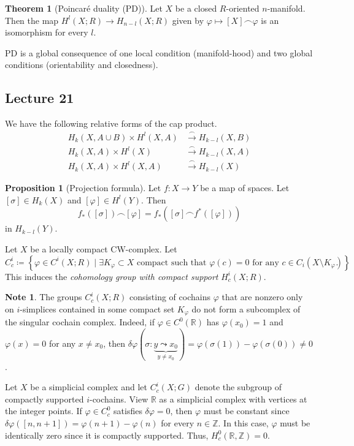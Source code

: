 \documentclass[10pt,letterpaper,cm]{nupset}
\theoremstyle{definition}
\newtheorem{note}[definition]{Note}
\theoremstyle{theorem}
\newtheorem{theorem}[definition]{Theorem}
\newtheorem{prop}[definition]{Proposition}
\theoremstyle{remark}
\newcommand{\R}{\mathbb{R}}
\newcommand{\Z}{\mathbb Z}
\newcommand{\1}{\mathbb{1}}
\newcommand{\0}{\vec 0}
\begin{document}
\begin{theorem}[Poincar\'e duality (PD)]
Let $X$ be a closed $R$-oriented $n$-manifold. Then the map $H^l(X; R) \to H_{n-l}(X;R)$ given by $\varphi \mapsto [X] \frown \varphi$ is an isomorphism for every $l$. 
\end{theorem}


PD is a global consequence of one local condition (manifold-hood) and two global conditions (orientability and closedness). 


\subsection{Lecture 21}


We have the following relative forms of the cap product.
\begin{align*}
H_k(X, A \cup B) \times H^l(X, A) & \overset{\frown}{\longrightarrow} H_{k-l}(X, B)
 \\ H_k(X, A) \times H^l(X) & \overset{\frown}{\longrightarrow} H_{k-l}(X, A)
 \\  H_k(X, A) \times H^l(X, A) & \overset{\frown}{\longrightarrow} H_{k-l}(X)
\end{align*}


\begin{prop}[Projection formula]
Let $f: X \to Y$ be a map of spaces. Let $[\sigma] \in H_k(X)$ and $[\varphi] \in H^l(Y)$. Then $$f_{\ast}([\sigma]) \frown [\varphi] = f_{\ast}([\sigma] \frown f^{\ast}([\varphi]))    $$ in $H_{k-l}(Y)$.
\end{prop}

\smallskip

Let $X$ be a locally compact CW-complex. Let $$C_c^i \coloneqq \left\{\varphi \in C^i(X; R) \mid \exists K_{\varphi}\subset X \text{ compact such that }\varphi(c) = 0 \text{ for any }c\in C_i(X \setminus K_{\varphi})\right\}.$$ This induces the \textit{cohomology group with compact support} $H^i_c(X; R)$.


\begin{note}
The groups $C^i_c(X;R)$ consisting of cochains $\varphi$ that are nonzero only on  $i$-simplices contained in some compact set $K_{\varphi}$ do not form a subcomplex of the singular cochain complex. Indeed, if $\varphi \in C^0(\R)$ has $\varphi(x_0) =1$ and $\varphi(x) =0$ for any $x\ne x_0$, then $\delta{\varphi}(\sigma : \underbrace{y \leadsto x_0}_{y\ne x_0}) = \varphi(\sigma(1)) - \varphi(\sigma(0)) \ne 0$.
\end{note}


Let  $X$ be a simplicial complex and let $C^i_c(X;G)$ denote the subgroup of compactly supported $i$-cochains. View $\R$ as a simplicial complex with vertices at the integer points. If $\varphi \in C^0_c$ satisfies $\delta{\varphi} =0$, then $\varphi$ must be constant since $\delta{\varphi}([n, n+1]) = \varphi(n+1) - \varphi(n)$ for every $n\in \Z$. In this case, $\varphi$ must be identically zero since it is compactly supported. Thus, $H^0_c(\R, \Z) =0$.
\end{document}
